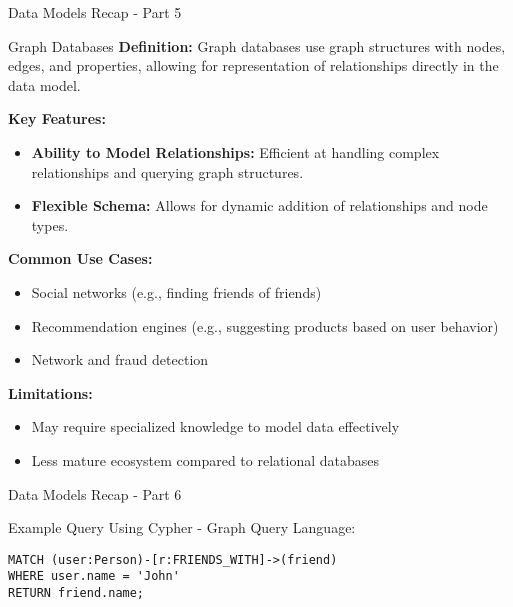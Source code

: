 \documentclass[aspectratio=169]{beamer}
\begin{document}
\begin{frame}[fragile]{Data Models Recap - Part 5}
  \begin{block}{Graph Databases}
    \textbf{Definition:}  
    Graph databases use graph structures with nodes, edges, and properties, allowing for representation of relationships directly in the data model.

    \textbf{Key Features:}
    \begin{itemize}
      \item \textbf{Ability to Model Relationships:} Efficient at handling complex relationships and querying graph structures.
      \item \textbf{Flexible Schema:} Allows for dynamic addition of relationships and node types.
    \end{itemize}

    \textbf{Common Use Cases:}
    \begin{itemize}
      \item Social networks (e.g., finding friends of friends)
      \item Recommendation engines (e.g., suggesting products based on user behavior)
      \item Network and fraud detection
    \end{itemize}

    \textbf{Limitations:}
    \begin{itemize}
      \item May require specialized knowledge to model data effectively
      \item Less mature ecosystem compared to relational databases
    \end{itemize}
  \end{block}
\end{frame}

\begin{frame}[fragile]{Data Models Recap - Part 6}
  \begin{block}{Example Query}
    Using Cypher - Graph Query Language:
    \begin{lstlisting}[language=cypher]
MATCH (user:Person)-[r:FRIENDS_WITH]->(friend)
WHERE user.name = 'John'
RETURN friend.name;
    \end{lstlisting}
  \end{block}
\end{frame}
\end{document}
